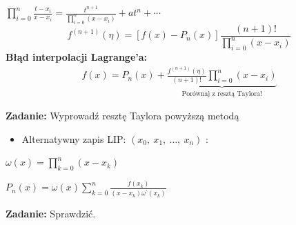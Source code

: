  \begin{frame}


$\displaystyle \prod_{i=0}^{n}\frac{t-x_{i}}{x-x_{i}}=\frac{t^{n+1}}{\prod_{i=0}^{n}(x-x_{i})}+at^{n}+\cdots$
$$
f^{(n+1)}(\eta)=[f(x)-P_{n}(x)]\frac{(n+1)!}{\prod_{i=0}^{n}(x-x_{i})}
$$
\textbf{Błąd interpolacji Lagrange'a:}
\begin{gather*}
  f(x)=P_{n}(x)+\underbrace{\frac{f^{(n+1)}(\eta)}{(n+1)!}\prod_{i=0}^{n}(x-x_{i})}_{\text{Porównaj z resztą Taylora!}}
\end{gather*}



\textbf{Zadanie:} Wyprowadź resztę Taylora powyższą metodą \\
\end{frame}

\begin{frame}
\begin{itemize}
\item Alternatywny zapis LIP: $(x_{0},\ x_{1},\ \ldots,\ x_{n})$ :
\end{itemize}
$\displaystyle \omega(x)=\prod_{k=0}^{n}(x-x_{k})$

$P_{n}(x)=\displaystyle \omega(x)\sum_{k=0}^{n}\frac{f(x_{k})}{(x-x_{k})\omega ^{'}(x_{k})}$ \\
\vspace{5mm}

\textbf{Zadanie:} Sprawdzić.

 \end{frame}
